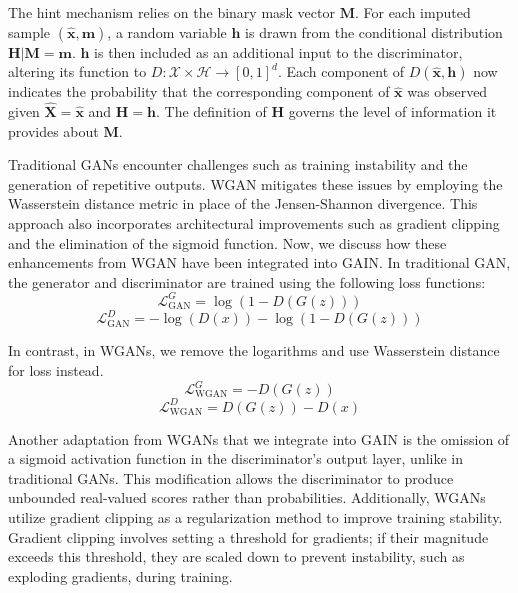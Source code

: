 The hint mechanism relies on the binary mask vector \( \mathbf{M} \). For each imputed sample \( (\hat{\mathbf{x}}, \mathbf{m}) \), a random variable \( \mathbf{h} \) is drawn from the conditional distribution \( \mathbf{H} | \mathbf{M} = \mathbf{m} \). \( \mathbf{h} \) is then included as an additional input to the discriminator, altering its function to \( D: \mathcal{X} \times \mathcal{H} \rightarrow [0, 1]^d \). Each component of \( D(\hat{\mathbf{x}}, \mathbf{h}) \) now indicates the probability that the corresponding component of \( \hat{\mathbf{x}} \) was observed given \( \hat{\mathbf{X}} = \hat{\mathbf{x}} \) and \( \mathbf{H} = \mathbf{h} \). The definition of \( \mathbf{H} \) governs the level of information it provides about \( \mathbf{M} \).






Traditional GANs encounter challenges such as training instability and the generation of repetitive outputs. WGAN mitigates these issues by employing the Wasserstein distance metric in place of the Jensen-Shannon divergence. This approach also incorporates architectural improvements such as gradient clipping and the elimination of the sigmoid function. Now, we discuss how these enhancements from WGAN have been integrated into GAIN.
In traditional GAN, the generator and discriminator are trained using the following loss functions:
\[
\mathcal{L}_{\text{GAN}}^G = \log(1 - D(G(z)))
\]
\[
\mathcal{L}_{\text{GAN}}^D = -\log(D(x)) - \log(1 - D(G(z)))
\]

In contrast, in WGANs, we remove the logarithms and use Wasserstein distance for loss instead.
\[
\mathcal{L}_{\text{WGAN}}^G = -D(G(z))
\]
\[
\mathcal{L}_{\text{WGAN}}^D = D(G(z)) - D(x)
\]

Another adaptation from WGANs that we integrate into GAIN is the omission of a sigmoid activation function in the discriminator's output layer, unlike in traditional GANs. This modification allows the discriminator to produce unbounded real-valued scores rather than probabilities. Additionally, WGANs utilize gradient clipping as a regularization method to improve training stability. Gradient clipping involves setting a threshold for gradients; if their magnitude exceeds this threshold, they are scaled down to prevent instability, such as exploding gradients, during training.